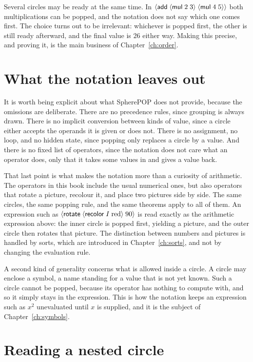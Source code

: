 Several circles may be ready at the same time. In $\langle \mathsf{add}\; \langle \mathsf{mul}\; 2\; 3\rangle\; \langle \mathsf{mul}\; 4\; 5\rangle\rangle$ both multiplications can be popped, and the notation does not say which one comes first. The choice turns out to be irrelevant: whichever is popped first, the other is still ready afterward, and the final value is $26$ either way. Making this precise, and proving it, is the main business of Chapter~\ref{ch:order}.

\section{What the notation leaves out}

It is worth being explicit about what SpherePOP does not provide, because the omissions are deliberate. There are no precedence rules, since grouping is always drawn. There is no implicit conversion between kinds of value, since a circle either accepts the operands it is given or does not. There is no assignment, no loop, and no hidden state, since popping only replaces a circle by a value. And there is no fixed list of operators, since the notation does not care what an operator does, only that it takes some values in and gives a value back.

That last point is what makes the notation more than a curiosity of arithmetic. The operators in this book include the usual numerical ones, but also operators that rotate a picture, recolour it, and place two pictures side by side. The same circles, the same popping rule, and the same theorems apply to all of them. An expression such as $\langle \mathsf{rotate}\; \langle \mathsf{recolor}\; I\; \mathrm{red}\rangle\; 90\rangle$ is read exactly as the arithmetic expression above: the inner circle is popped first, yielding a picture, and the outer circle then rotates that picture. The distinction between numbers and pictures is handled by sorts, which are introduced in Chapter~\ref{ch:sorts}, and not by changing the evaluation rule.

A second kind of generality concerns what is allowed inside a circle. A circle may enclose a symbol, a name standing for a value that is not yet known. Such a circle cannot be popped, because its operator has nothing to compute with, and so it simply stays in the expression. This is how the notation keeps an expression such as $x^{2}$ unevaluated until $x$ is supplied, and it is the subject of Chapter~\ref{ch:symbols}.

\section{Reading a nested circle}

